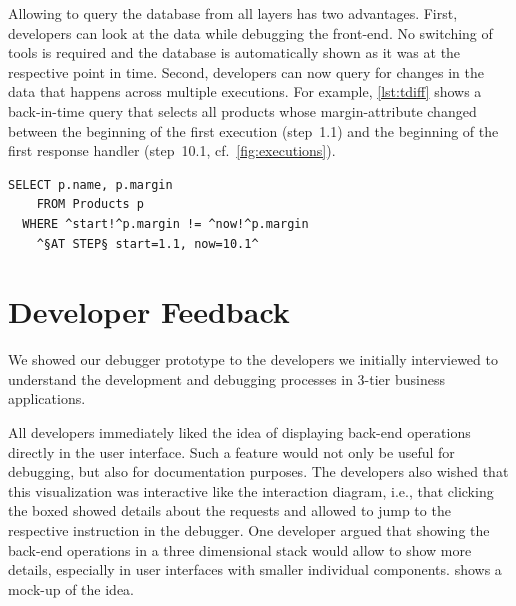 Allowing to query the database from all layers has two advantages.
First, developers can look at the data while debugging the front-end.
No switching of tools is required and the database is automatically shown as it was at the respective point in time.
Second, developers can now query for changes in the data that happens across multiple executions.
For example, \cref{lst:tdiff} shows a back-in-time query that selects all products whose margin-attribute changed between the beginning of the first execution (step~1.1) and the beginning of the first response handler (step~10.1, cf.~\cref{fig:executions}).

\begin{lstlisting}[language=HanaSQL,float=t,caption={A query selecting all products whose margin was changed during the operation.},label=lst:tdiff,numbers=none]
	SELECT p.name, p.margin
	FROM Products p
  WHERE ^start!^p.margin != ^now!^p.margin
	^§AT STEP§ start=1.1, now=10.1^
\end{lstlisting}


\section{Developer Feedback}

We showed our debugger prototype to the developers we initially interviewed to understand the development and debugging processes in 3-tier business applications.

All developers immediately liked the idea of displaying back-end operations directly in the user interface.
Such a feature would not only be useful for debugging, but also for documentation purposes.
The developers also wished that this visualization was interactive like the interaction diagram, i.e., that clicking the boxed showed details about the requests and allowed to jump to the respective instruction in the debugger.
One developer argued that showing the back-end operations in a three dimensional stack would allow to show more details, especially in user interfaces with smaller individual components.
 shows a mock-up of the idea.

